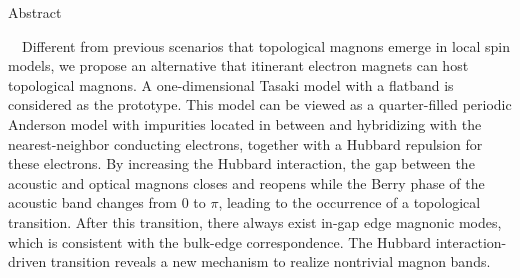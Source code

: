 \documentclass[a0,portrait]{a0poster}
\begin{document}
\begin{minipage}[c]{\linewidth}
\color{MidnightBlue}
\begin{huge}Abstract\end{huge}
\large
\ \ Different from previous scenarios that topological magnons emerge in local spin models, we propose an alternative that itinerant electron magnets can host topological magnons. A one-dimensional Tasaki model with a flatband is considered as the prototype. This model can be viewed as a quarter-filled periodic Anderson model with impurities located in between and hybridizing with the nearest-neighbor conducting electrons, together with a Hubbard repulsion for these electrons. By increasing the Hubbard interaction, the gap between the acoustic and optical magnons closes and reopens while the Berry phase of the acoustic band changes from 0 to $\pi$, leading to the occurrence of a topological transition. After this transition, there always exist in-gap edge magnonic modes, which is consistent with the bulk-edge correspondence. The Hubbard interaction-driven transition reveals a new mechanism to realize nontrivial magnon bands.
\end{minipage}


\vspace{1cm} %

\end{document}
